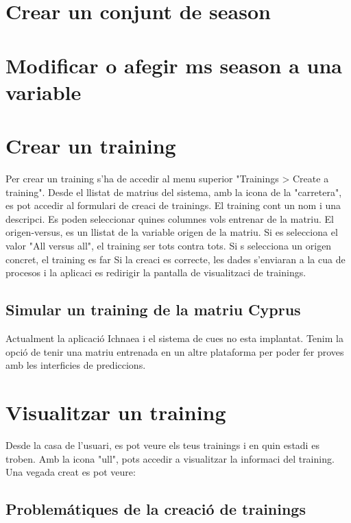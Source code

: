\section{Crear un conjunt de season}

\section{Modificar o afegir ms season a una variable}

\section{Crear un training}
Per crear un training s'ha de accedir al menu superior "Trainings > Create a training". Desde el llistat de matrius del sistema, amb la icona de la "carretera", es pot accedir al formulari de creaci de trainings.
El training cont un nom i una descripci. Es poden seleccionar quines columnes vols entrenar de la matriu. 
El origen-versus, es un llistat de la variable origen de la matriu. Si es selecciona el valor "All versus all", el training ser tots contra tots. Si s selecciona un origen concret, el training es far
Si la creaci \´e{s} correcte, les dades s'enviaran a la cua de procesos i la aplicaci es redirigir la pantalla de visualitzaci de trainings.

\subsection{Simular un training de la matriu Cyprus}
Actualment la aplicaci\'{o} Ichnaea i el sistema de cues no esta implantat. Tenim la opci\'{o} de tenir una matriu entrenada en un altre plataforma per poder fer proves amb les interficies de prediccions.

\section{Visualitzar un training}
Desde la casa de l'usuari, es pot veure els teus trainings i en quin estadi es troben. Amb la icona "ull", pots accedir a visualitzar la informaci del training.
Una vegada creat es pot veure:
\begin{itemize}
\end{itemize}

\subsection{Problem\'{a}tiques de la creaci\'{o} de trainings}
